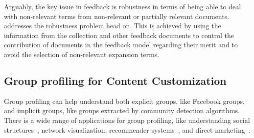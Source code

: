 %

\medskip
Arguably, the key issue in feedback is robustness in terms of being able to deal with non-relevant terms from non-relevant or partially relevant documents. \acswlm addresses the robustness problem head on. This is achieved by using the information from the collection and other feedback documents to control the contribution of documents in the feedback model regarding their merit and to avoid the selection of non-relevant expansion terms.

\subsection{Group profiling for Content Customization}
Group profiling can help understand both explicit groups, like Facebook groups, and implicit groups, like groups extracted by community detection algorithms. There is a wide range of applications for group profiling, like understanding social structures~\citep{Tang:2011}, network visualization, recommender systems~\citep{Hu:2014,Shang:2014,Amer-Yahia}, and direct marketing~\citep{Custers:2003}. 

